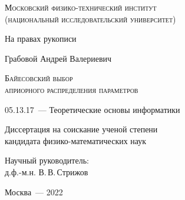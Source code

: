 \thispagestyle{empty}


\begin{titlepage}
\begin{center}
\textsc{Московский физико-технический институт \\ (национальный исследовательский университет)}\\
\end{center}
\vspace{1.5cm}
\begin{flushright}
{На правах рукописи}
\end{flushright}
\vspace{1.5cm}
\begin{center}
{Грабовой Андрей Валериевич}
\par
\vspace{2cm}
\textsc{Байесовский выбор
\\априорного распределения параметров}
\par
\vspace{2cm}
{05.13.17~--- Теоретические основы информатики}
\par
\vspace{2cm}
{Диссертация на соискание ученой степени\\
кандидата физико-математических наук}
\end{center}
\vspace{2cm}
\hfill\parbox{8,4cm}{Научный руководитель:
\\д.ф.-м.н. В.\,В.\,Стрижов}
\par
\vspace{3.5cm}
\begin{center}
{Москва~--- 2022}
\end{center}
\end{titlepage}